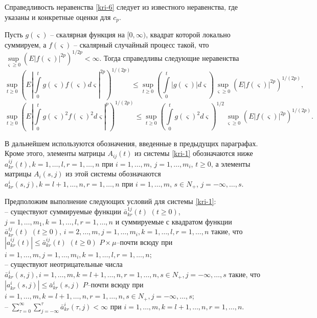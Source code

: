 Справедливость неравенства \eqref{kri-6} следует из известного неравенства,
где указаны и конкретные оценки для $c_p$.

\begin{lemma}\label{kri-lem3} Пусть $g(\varsigma)$ -- скалярная функция на $[0,
\infty)$, квадрат которой локально суммируем, а $f(\varsigma)$ --
скалярный случайный процесс такой, что $\sup \limits _{\varsigma
\geq 0}(E|f(\varsigma )|^{2p})^{1/2p} < \infty$. Тогда справедливы
следующие неравенства
\begin{equation}\label{kri-7}
\sup \limits _{t \geq 0}\left(E\left|\int \limits
_0^tg(\varsigma)f(\varsigma)d\varsigma\right|^{2p}\right)^{1/(2p)}
\leq \sup \limits _{t \geq 0}\left(\int \limits
_0^t|g(\varsigma)|d\varsigma\right)\sup \limits _{\varsigma \geq
0}\left(E\left|f(\varsigma)\right|^{2p}\right)^{1/(2p)},
\end{equation}
\begin{equation}\label{kri-8}
\sup \limits _{t \geq 0}\left(E|\int \limits
_0^tg(\varsigma)^2f(\varsigma)^2d\varsigma|^{p}\right)^{1/(2p)} \leq
\sup \limits _{t \geq 0}\left(\int \limits
_0^tg(\varsigma)^2d\varsigma\right)^{1/2}\sup \limits _{\varsigma
\geq 0}\left(E\left|f(\varsigma)\right|^{2p}\right)^{1/(2p)}.
\end{equation}
\end{lemma}

В дальнейшем используются  обозначения, введенные в предыдущих
параграфах. Кроме этого, элементы матрицы $A_{ij}(t)$ из системы \eqref{kri-1}
обозначаются ниже $a^{ij}_{kr}(t), k =1,\dots,l, r = 1,\dots,n$  при $i
= 1,\dots,m$, $j = 1,\dots,m_i$, $t \geq 0$, а элементы матрицы
$A_i(s,j)$ из этой системы обозначаются $a^i_{kr}(s,j), k =
l+1,\dots,n, r = 1,\dots,n$ при $i=1,\dots,m$, $s\in N_+$,
$j=-\infty,\dots,s$.

Предположим выполнение следующих условий для системы \eqref{kri-1}:\\
\noindent
  -- существуют  суммируемые функции $\bar
a^{1j}_{kr}(t)\,\, (t\geq 0)$, $j = 1,\dots,m_1, k =1,\dots,l, r =
1,\dots,n$ и суммируемые с квадратом функции $\bar a^{ij}_{kr}(t)\,\,
(t\geq 0)$, $i = 2,\dots,m, j = 1,\dots,m_i, k =1,\dots,l, r = 1,\dots,n$
такие, что $|a^{ij}_{kr}(t)|\leq \bar a^{ij}_{kr}(t)\,\, (t\geq 0)$
$P\times\mu$--почти всюду при $i = 1, \dots, m, j = 1,\dots,m_i, k
=1,\dots,l, r = 1,\dots,n$;\\
  -- существуют
неотрицательные числа $\bar a^i_{kr}(s,j),i=1,\dots,m, k = l+1, \dots,
n, r = 1,\dots,n, s\in N_+, j=-\infty,\dots,s$ такие, что
$|a^i_{kr}(s,j)| \leq \bar a^i_{kr}(s,j)$ $P$--почти всюду при
$i=1,\dots,m, k = l+1, \dots, n, r = 1,\dots,n, s\in N_+, j=-\infty,\dots,s
$;\\
  -- $ \sum \limits _{\tau=0 }^{\infty }\sum \limits _{j = -\infty
}^{\tau}\bar a^{i}_{kr}(\tau,j) < \infty$ при $i=1,\dots,m, k = l+1,
\dots, n, r = 1,\dots,n$.

